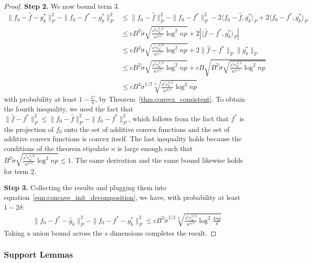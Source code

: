 \begin{proof}
\textbf{Step 2.} We now bound term 3.
\begin{align*}
\| f_0 - \hat{f} - g^*_k \|_P^2 - \| f_0 - f^* - g^*_k\|_P^2 &\leq 
    \| f_0 - \hat{f} \|_P^2 - \|f_0 - f^*\|_P^2 - 2\langle f_0 - \hat{f}, g^*_k \rangle_P
   + 2 \langle f_0 - f^*, g^*_k \rangle_P \\
 &\leq c B^2 \tilde{\sigma} \sqrt{ \frac{s^5 c_u^{1/2}}{n^{4/5}} \log^2 np} + 
    2 | \langle \hat{f} - f^*, g^*_k \rangle_P |  \\
 &\leq  c B^2 \tilde{\sigma} \sqrt{ \frac{s^5 c_u^{1/2}}{n^{4/5}} \log^2 np} +
    2 \| \hat{f} - f^* \|_P \| g^*_k \|_P \\
&\leq  c B^2 \tilde{\sigma} \sqrt{ \frac{s^5 c_u^{1/2}}{n^{4/5}} \log^2 np} +
   c B \sqrt{B^2 \tilde{\sigma} \sqrt{ 
                   \frac{s^5 c_u^{1/2}}{n^{4/5}} \log^2 np} }\\
&\leq  cB^2 \tilde{\sigma}^{1/2} \sqrt[4]{ 
                   \frac{s^5 c_u^{1/2}}{n^{4/5}} \log^2 np} 
\end{align*}
with probability at least $1-\frac{C}{n}$, by
Theorem~\ref{thm:convex_consistent}. To obtain the fourth inequality,
we used the fact that $\| \hat{f} - f^* \|_P^2 \leq \| f_0 - \hat{f}
\|_P^2 - \|f_0 - f^*\|_P^2$, which follows from the fact that $f^*$ is the
projection of $f_0$ onto the set of additive convex functions and the
set of additive convex functions is convex itself.
The last inequality holds because the conditions of the theorem stipulate $n$
is large enough such that $B^2 \tilde{\sigma} \sqrt{ \frac{s^5c_u^{1/2}}{n^{4/5}} \log^2 np} \leq 1$.
The same derivation and the same bound likewise holds for term 2.

\textbf{Step 3.} Collecting the results and plugging them into equation~\eqref{eqn:concave_init_decomposition}, we have, with probability at least $1-2\delta$:
\begin{align*}
\| f_0 - f^* - \hat{g}_k \|_P^2 - \|f_0 - f^* - g^*_k \|_P^2 \leq
   c B^2 \tilde{\sigma}^{1/2} 
     \sqrt[4]{ \frac{s^5c_u^{1/2}}{n^{4/5}} \log^2 \frac{4np}{\delta}} 
\end{align*}
Taking a union bound across the $s$ dimensions completes the result.
\end{proof}



\subsubsection{Support Lemmas}


